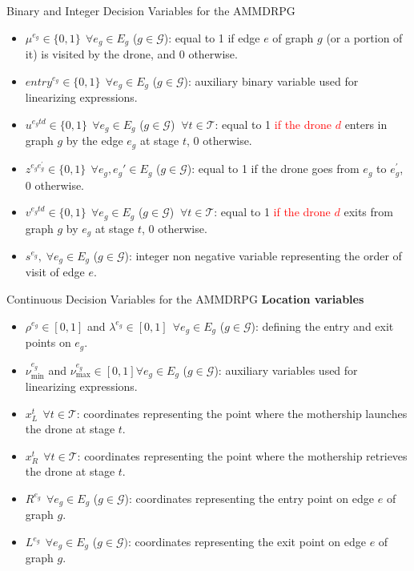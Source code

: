 \documentclass[slidestop,usepdftitle=false,10pt]{beamer}
\begin{document}
	\begin{frame}{Binary and Integer Decision Variables for the AMMDRPG}
	\begin{itemize}
	    \item $\mu^{e_g} \in \{0,1\} \:\: \forall e_g \in E_g$ ($g \in \mathcal{G}$): equal to 1 if edge $e$ of graph $g$ (or a portion of it) is visited by the drone, and  0 otherwise.
        \item $entry^{e_g} \in \{0,1\} \:\: \forall e_g \in E_g$ ($g \in \mathcal{G}$): auxiliary binary variable used for linearizing expressions.
        \item $u^{e_{g}td} \in \{0,1\} \:\: \forall e_g \in E_g$ ($g \in \mathcal{G}$) $\: \forall t \in \mathcal T$: equal to 1 \textcolor{red}{if the drone $d$} enters in graph $g$ by the edge $e_g$ at stage $t$, 0 otherwise.
        \item $z^{e_{g}e^{'}_{g}} \in \{0,1\} \:\: \forall e_g, e_g' \in E_g$ ($g \in \mathcal{G}$): equal to 1 if the drone goes from $e_g$ to $e^{'}_{g}$, 0 otherwise.
        \item $v^{e_{g}td} \in \{0,1\} \:\: \forall e_g \in E_g$ ($g \in \mathcal{G}$) $\: \forall t \in \mathcal T$: equal to 1 \textcolor{red}{if the drone $d$} exits from graph $g$ by $e_g$ at stage $t$, 0 otherwise.
        \item $s^{e_g},\; \forall e_g \in E_g$ ($g \in \mathcal{G}$): integer non negative variable representing the order of visit of edge $e$.
    \end{itemize}
	\end{frame}
	
	\begin{frame}{Continuous Decision Variables for the AMMDRPG}
	\textbf{Location variables}
	\begin{itemize}
	    \item $\rho^{e_g} \in [0,1]$ and $\lambda^{e_g} \in [0,1] \:\: \forall e_g \in E_g$ ($g \in \mathcal{G}$): defining the entry and exit points on $e_g$.
        \item $\nu_\text{min}^{e_g}$ and $\nu_\text{max}^{e_g} \in [0,1] \forall e_g \in E_g$ ($g \in \mathcal{G}$): auxiliary variables used for linearizing expressions.
        \item $x_L^t \:\: \forall t \in \mathcal T$: coordinates representing the point where the mothership launches the drone at stage $t$.
        \item $x_R^t \:\: \forall t \in \mathcal T$: coordinates representing the point where the mothership retrieves the drone at stage $t$.
        \item $R^{e_g} \:\: \forall e_g \in E_g$ ($g \in \mathcal{G}$): coordinates representing the entry point on edge $e$ of graph $g$.
        \item $L^{e_g} \:\: \forall e_g \in E_g$ ($g \in \mathcal{G})$: coordinates representing the exit point on edge $e$ of graph $g$.
    \end{itemize}
    \end{frame}
    
\end{document}

